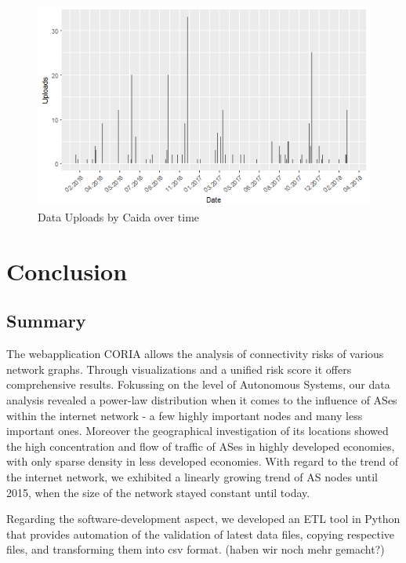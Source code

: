 \documentclass[conference, 11pt]{IEEEtran}
\begin{document}
\begin{figure}[htbp]
\centerline{\includegraphics[scale=0.5]{Graphics/uploadFrequency.png}}
\caption{Data Uploads by Caida over time}
\label{fig}
\end{figure}



\section{Conclusion}
\subsection{Summary}

The webapplication CORIA allows the analysis of connectivity risks of various network graphs. Through visualizations and a unified risk score it offers comprehensive results. Fokussing on the level of Autonomous Systems, our data analysis revealed a power-law distribution when it comes to the influence of ASes within the internet network - a few highly important nodes and many less important ones. Moreover the geographical investigation of its locations showed the high concentration and flow of traffic of ASes in highly developed economies, with only sparse density in less developed economies. With regard to the trend of the internet network, we exhibited a linearly growing trend of AS nodes until 2015, when the size of the network stayed constant until today.

Regarding the software-development aspect, we developed an ETL tool in Python that provides automation of the validation of latest data files, copying respective files, and transforming them into csv format.  (haben wir noch mehr gemacht?)

 
\end{document}
